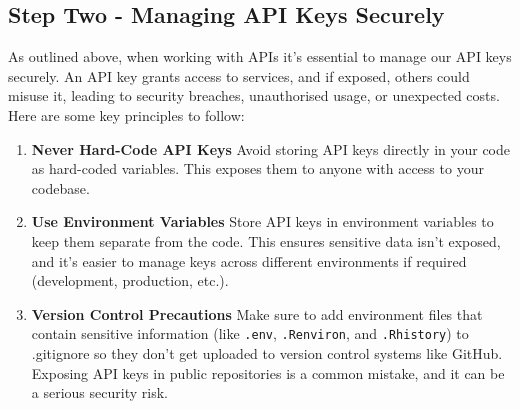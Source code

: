 \documentclass[
  letterpaper,
  DIV=11,
  numbers=noendperiod]{scrreprt}
\begin{document}
\subsection{Step Two - Managing API Keys
Securely}\label{step-two---managing-api-keys-securely}

As outlined above, when working with APIs it's essential to manage our
API keys securely. An API key grants access to services, and if exposed,
others could misuse it, leading to security breaches, unauthorised
usage, or unexpected costs. Here are some key principles to follow:

\begin{enumerate}
\def\labelenumi{\arabic{enumi}.}
\item
  \textbf{Never Hard-Code API Keys} Avoid storing API keys directly in
  your code as hard-coded variables. This exposes them to anyone with
  access to your codebase.
\item
  \textbf{Use Environment Variables} Store API keys in environment
  variables to keep them separate from the code. This ensures sensitive
  data isn't exposed, and it's easier to manage keys across different
  environments if required (development, production, etc.).
\item
  \textbf{Version Control Precautions} Make sure to add environment
  files that contain sensitive information (like \texttt{.env},
  \texttt{.Renviron}, and \texttt{.Rhistory}) to .gitignore so they
  don't get uploaded to version control systems like GitHub. Exposing
  API keys in public repositories is a common mistake, and it can be a
  serious security risk.
\end{enumerate}
\end{document}
